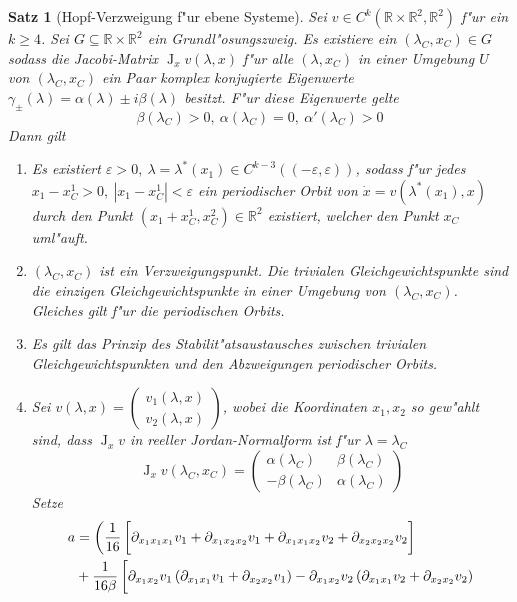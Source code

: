\documentclass[a4paper, 13pt]{scrreprt}
\newtheorem{satz}{Satz}[section]
\theoremstyle{definition} \newtheorem{definition}{Definition}[section]
\newcommand{\RR}{\mathbb{R}}
\begin{document}
\begin{satz}[Hopf-Verzweigung f"ur ebene Systeme]
Sei $v\in C^k(\RR\times\RR^2, \RR^2)$ f"ur ein $k\geq 4$. Sei $G\subseteq \RR\times\RR^2$ ein Grundl"osungszweig. Es existiere ein $(\lambda_C, x_C) \in G$ sodass die Jacobi-Matrix $\operatorname{J}_x v(\lambda, x)$ f"ur alle $(\lambda, x_C)$ in einer Umgebung $U$ von $(\lambda_C, x_C)$ ein Paar komplex konjugierte Eigenwerte $\gamma_\pm(\lambda) = \alpha(\lambda) \pm i \beta(\lambda)$ besitzt. F"ur diese Eigenwerte gelte
$$ \beta(\lambda_C) > 0, \ \alpha(\lambda_C) = 0, \ \alpha'(\lambda_C) > 0 $$
Dann gilt
\begin{enumerate}
\item Es existiert $\varepsilon > 0, \ \lambda = \lambda^*(x_1) \in C^{k-3}((-\varepsilon, \varepsilon))$, sodass f"ur jedes $x_1 - x_C^1 > 0, \ |x_1 - x_C^1| < \varepsilon$ ein periodischer Orbit von $\dot x = v(\lambda^*(x_1), x)$ durch den Punkt $(x_1 + x_C^1, x_C^2) \in \RR^2$ existiert, welcher den Punkt $x_C$ uml"auft.
\item $(\lambda_C, x_C)$ ist ein Verzweigungspunkt. Die trivialen Gleichgewichtspunkte sind die einzigen Gleichgewichtspunkte in einer Umgebung von $(\lambda_C, x_C)$. Gleiches gilt f"ur die periodischen Orbits.
\item Es gilt das \emph{Prinzip des Stabilit"atsaustausches} zwischen trivialen Gleichgewichtspunkten und den Abzweigungen periodischer Orbits.
\item Sei $v(\lambda, x) = \begin{pmatrix} v_1(\lambda, x) \\ v_2(\lambda, x) \end{pmatrix}$, wobei die Koordinaten $x_1, x_2$ so gew"ahlt sind, dass $\operatorname{J}_xv$ in reeller Jordan-Normalform ist f"ur $\lambda = \lambda_C$
$$ \operatorname{J}_x v(\lambda_C, x_C) = \begin{pmatrix}
\alpha(\lambda_C)  &\beta(\lambda_C) \\ -\beta(\lambda_C)& \alpha(\lambda_C)
\end{pmatrix}$$
Setze 
\begin{align*}
\begin{split}
 a &= \left (\frac {1}{16}\left[\vphantom{\frac{1}{16}}\partial_{x_1x_1x_1}v_1 + \partial_{x_1x_2x_2}v_1 + \partial_{x_1x_1x_2}v_2 + \partial_{x_2x_2x_2}v_2\right] \right . \\
 &+ \frac{1}{16\beta}\left[ \vphantom{\frac{1}{16}} \partial_{x_1x_2}v_1\left(\partial_{x_1x_1}v_1 + \partial_{x_2x_2}{v_1}\right) - \partial_{x_1x_2}v_2\left(\partial_{x_1x_1}v_2 + \partial_{x_2x_2}v_2\right) \right .\\

\end{split}
\end{align*}
\end{enumerate}
\end{satz}
\end{document}
